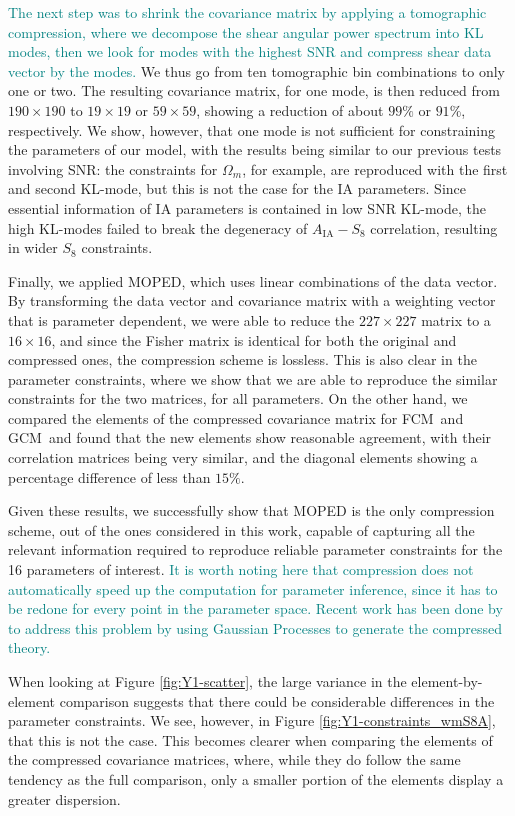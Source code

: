 \documentclass[twocolumn]{\docclass}
\newcommand{\rf}[1]{Figure \ref{fig:#1}}
\newcommand\full{FCM}
\newcommand\gaussian{GCM}
\begin{document}
	\textcolor{teal}{The next step was to shrink the covariance matrix by applying a tomographic compression, where we decompose the shear angular power spectrum into KL modes, then we look for modes with the highest SNR and compress shear data vector by the modes.} We thus go from ten tomographic bin combinations to only one or two. The resulting covariance matrix, for one mode, is then reduced from $190 \times 190$ to $19 \times 19$ or $59 \times 59$, showing a reduction of about $99\%$ or $91\%$, respectively. We show, however, that one mode is not sufficient for constraining the parameters of our model, with the results being similar to our previous tests involving SNR: the constraints for $\Omega_m$, for example, are reproduced with the first and second KL-mode, but this is not the case for the IA parameters. Since essential information of IA parameters is contained in low SNR KL-mode, the high KL-modes failed to break the degeneracy of $A_{\mathrm{IA}}-S_8$ correlation, resulting in wider $S_8$ constraints. 
	
	Finally, we applied MOPED, which uses linear combinations of the data vector. By transforming the data vector and covariance matrix with a weighting vector that is parameter dependent, we were able to reduce the $227 \times 227$ matrix to a $16 \times 16$, and since the Fisher matrix is identical for both the original and compressed ones, the compression scheme is lossless. This is also clear in the parameter constraints, where we show that we are able to reproduce the similar constraints for the two matrices, for all parameters. On the other hand, we compared the elements of the compressed covariance matrix for \full\ and \gaussian\ and found that the new elements show reasonable agreement, with their correlation matrices being very similar, and the diagonal elements showing a percentage difference of less than $15\%$.
	
	Given these results, we successfully show that MOPED is the only compression scheme, out of the ones considered in this work, capable of capturing all the relevant information required to reproduce reliable parameter constraints for the 16 parameters of interest. \textcolor{teal}{It is worth noting here that compression does not automatically speed up the computation for parameter inference, since it has to be redone for every point in the parameter space. Recent work has been done by \cite{Mootoovaloo:2020} to address this problem by using Gaussian Processes to generate the compressed theory.}
	
	When looking at \rf{Y1-scatter}, the large variance in the element-by-element comparison suggests that there could be considerable differences in the parameter constraints. We see, however, in \rf{Y1-constraints_wmS8A}, that this is not the case. This becomes clearer when comparing the elements of the compressed covariance matrices, where, while they do follow the same tendency as the full comparison, only a smaller portion of the elements display a greater dispersion.
	
\end{document}
